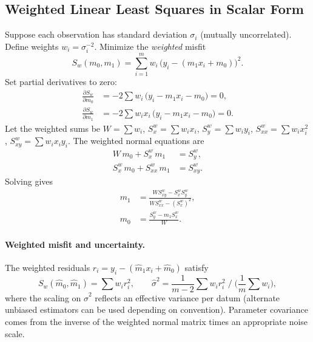 \documentclass[11pt,a4paper]{article}
\begin{document}
\subsection{Weighted Linear Least Squares in Scalar Form}
Suppose each observation has standard deviation $\sigma_i$ (mutually uncorrelated). Define weights $w_i = \sigma_i^{-2}$. Minimize the \emph{weighted} misfit
\begin{equation}
  S_w(m_0,m_1) = \sum_{i=1}^m w_i\,\big(y_i - (m_1 x_i + m_0)\big)^2.
\end{equation}
Set partial derivatives to zero:
\begin{align}
  \frac{\partial S_w}{\partial m_0} &= -2\sum w_i\,\big(y_i - m_1 x_i - m_0\big)=0, \\
  \frac{\partial S_w}{\partial m_1} &= -2\sum w_i x_i\,\big(y_i - m_1 x_i - m_0\big)=0.
\end{align}
Let the weighted sums be $W=\sum w_i$, $S_x^w=\sum w_i x_i$, $S_y^w=\sum w_i y_i$, $S_{xx}^w=\sum w_i x_i^2$, $S_{xy}^w=\sum w_i x_i y_i$. The weighted normal equations are
\begin{align}
  W\,m_0 + S_x^w\,m_1 &= S_y^w, \\
  S_x^w\,m_0 + S_{xx}^w\,m_1 &= S_{xy}^w.
\end{align}
Solving gives
\begin{align}
  m_1 &= \frac{W S_{xy}^w - S_x^w S_y^w}{W S_{xx}^w - (S_x^w)^2}, \\
  m_0 &= \frac{S_y^w - m_1 S_x^w}{W}.
\end{align}
\paragraph{Weighted misfit and uncertainty.} The weighted residuals $r_i=y_i-(\widehat{m}_1 x_i+\widehat{m}_0)$ satisfy
\begin{equation}
  S_w(\widehat{m}_0,\widehat{m}_1) = \sum w_i r_i^2,\qquad
  \widehat{\sigma}^2 = \frac{1}{m-2}\sum w_i r_i^2 \;\Big/\;\Big(\frac{1}{m}\sum w_i\Big),
\end{equation}
where the scaling on $\widehat{\sigma}^2$ reflects an effective variance per datum (alternate unbiased estimators can be used depending on convention). Parameter covariance comes from the inverse of the weighted normal matrix times an appropriate noise scale.
\end{document}
